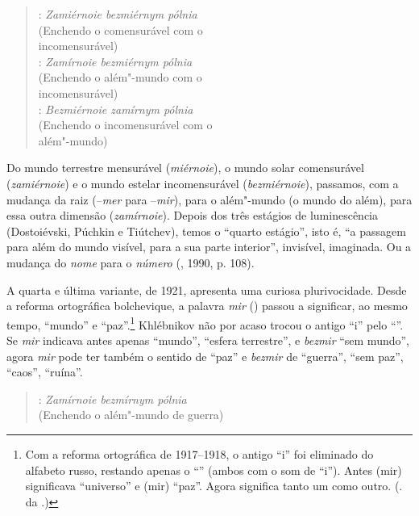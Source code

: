 \begin{verse}
: \emph{Zamiérnoie bezmiérnym pólnia} \\
(Enchendo o comensurável com o \\
incomensurável) \\[8pt]

: \emph{Zamírnoie bezmiérnym pólnia} \\
(Enchendo o além"-mundo com o \\
incomensurável) \\[8pt]

: \emph{Bezmiérnoie zamírnym pólnia} \\
(Enchendo o incomensurável com o \\
além"-mundo)
\end{verse}

Do mundo terrestre mensurável (\emph{miérnoie}), o mundo solar
comensurável (\emph{zamiérnoie}) e o mundo estelar incomensurável
(\emph{bezmiérnoie}), passamos, com a mudança da raiz (--\emph{mer} para
--\emph{mir}), para o além"-mundo (o mundo do além), para essa outra
dimensão (\emph{zamírnoie}). Depois dos três estágios de luminescência
(Dostoiévski, Púchkin e Tiútchev), temos o ``quarto estágio'', isto é, ``a passagem para além do mundo visível, para a sua parte interior'',
invisível, imaginada. Ou a mudança do \emph{nome} para o \emph{número}
(, 1990, p. 108).

A quarta e última variante, de 1921, apresenta uma curiosa plurivocidade.
Desde a reforma ortográfica bolchevique, a palavra \emph{mir} ({}) passou a significar, ao mesmo
tempo, ``mundo'' e ``paz''.\footnote{Com a reforma ortográfica de 1917--1918, o antigo ``i''
  foi eliminado do alfabeto russo, restando apenas o ``{}'' (ambos com o
  som de ``i''). Antes {} (mir) significava ``universo'' e {} (mir)
  ``paz''. Agora {} significa tanto um como outro. (. da .)}
Khlébnikov não por acaso trocou o antigo ``i'' pelo ``{}''. Se \emph{mir}
indicava antes apenas ``mundo'', ``esfera terrestre'', e \emph{bezmir}
``sem mundo'', agora \emph{mir} pode ter também o sentido de ``paz'' e
\emph{bezmir} de ``guerra'', ``sem paz'', ``caos'', ``ruína''.

\begin{verse}
: \emph{Zamírnoie bezmírnym pólnia} \\
(Enchendo o além"-mundo de guerra)
\end{verse}

